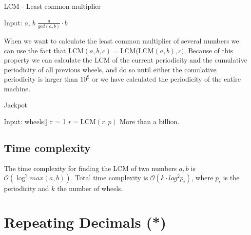 \documentclass[11pt,a4paper,twoside]{article}
\begin{document}
\begin{algorithm}
    \caption{LCM - Least common multiplier}
    \label{lst:LCM}
    \begin{algorithmic}
        \REQUIRE Input: $a$, $b$
        \RETURN $ \frac{a}{gcd(a, b)} \cdot b$
    \end{algorithmic}
\end{algorithm}

When we want to calculate the least common multiplier of several numbers we can
use the fact that LCM$(a, b, c) = $LCM$($LCM$(a, b), c)$. Because of this
property we can calculate the LCM of the current periodicity and the cumulative
periodicity of all previous wheels, and do so until either the comulative
periodicity is larger than $10^9$ or we have calculated the periodicity of the
entire machine.

\begin{algorithm}
    \caption{Jackpot}
    \label{lst:jackpot}
    \begin{algorithmic}
        \REQUIRE Input: wheels[] 
        \STATE r = 1
            \STATE $r = $LCM$(r, p)$
                \PRINT More than a billion.
            \ENDIF
        \ENDFOR
    \end{algorithmic}
\end{algorithm}

\subsection{Time complexity}
The time complexity for finding the LCM of two numbers $a,b$ is
$\mathcal{O}(\log^2{max(a,b)})$. Total time complexity is $\mathcal{O}(k \cdot
log^2{p_i})$, where $p_i$ is the periodicity and $k$ the number of wheels.

\section{Repeating Decimals (*)}
\end{document}
